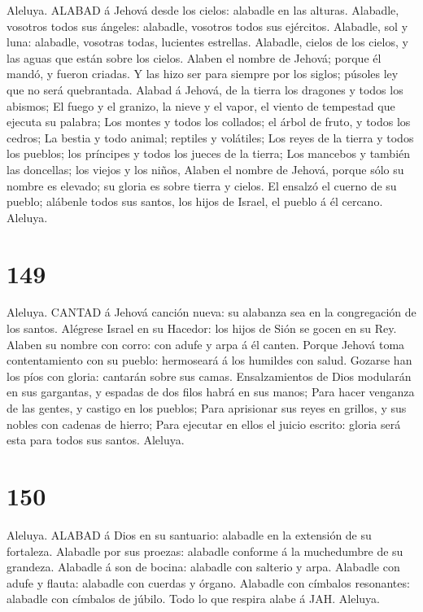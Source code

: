  Aleluya. ALABAD á Jehová desde los cielos: alabadle en las
alturas.  Alabadle, vosotros todos sus ángeles: alabadle,
vosotros todos sus ejércitos.  Alabadle, sol y luna:
alabadle, vosotras todas, lucientes estrellas.  Alabadle,
cielos de los cielos, y las aguas que están sobre los cielos.
 Alaben el nombre de Jehová; porque él mandó, y fueron
criadas.  Y las hizo ser para siempre por los siglos;
púsoles ley que no será quebrantada.  Alabad á Jehová, de la
tierra los dragones y todos los abismos;  El fuego y el
granizo, la nieve y el vapor, el viento de tempestad que ejecuta su
palabra;  Los montes y todos los collados; el árbol de
fruto, y todos los cedros;  La bestia y todo animal;
reptiles y volátiles;  Los reyes de la tierra y todos los
pueblos; los príncipes y todos los jueces de la tierra; 
Los mancebos y también las doncellas; los viejos y los niños,
 Alaben el nombre de Jehová, porque sólo su nombre es
elevado; su gloria es sobre tierra y cielos.  El ensalzó el
cuerno de su pueblo; alábenle todos sus santos, los hijos de Israel, el
pueblo á él cercano. Aleluya.

\hypertarget{section-148}{%
\section{149}\label{section-148}}

 Aleluya. CANTAD á Jehová canción nueva: su alabanza sea en
la congregación de los santos.  Alégrese Israel en su
Hacedor: los hijos de Sión se gocen en su Rey.  Alaben su
nombre con corro: con adufe y arpa á él canten.  Porque
Jehová toma contentamiento con su pueblo: hermoseará á los humildes con
salud.  Gozarse han los píos con gloria: cantarán sobre sus
camas.  Ensalzamientos de Dios modularán en sus gargantas, y
espadas de dos filos habrá en sus manos;  Para hacer
venganza de las gentes, y castigo en los pueblos;  Para
aprisionar sus reyes en grillos, y sus nobles con cadenas de hierro;
 Para ejecutar en ellos el juicio escrito: gloria será esta
para todos sus santos. Aleluya.

\hypertarget{section-149}{%
\section{150}\label{section-149}}

 Aleluya. ALABAD á Dios en su santuario: alabadle en la
extensión de su fortaleza.  Alabadle por sus proezas:
alabadle conforme á la muchedumbre de su grandeza.  Alabadle
á son de bocina: alabadle con salterio y arpa.  Alabadle con
adufe y flauta: alabadle con cuerdas y órgano.  Alabadle con
címbalos resonantes: alabadle con címbalos de júbilo.  Todo
lo que respira alabe á JAH. Aleluya.
